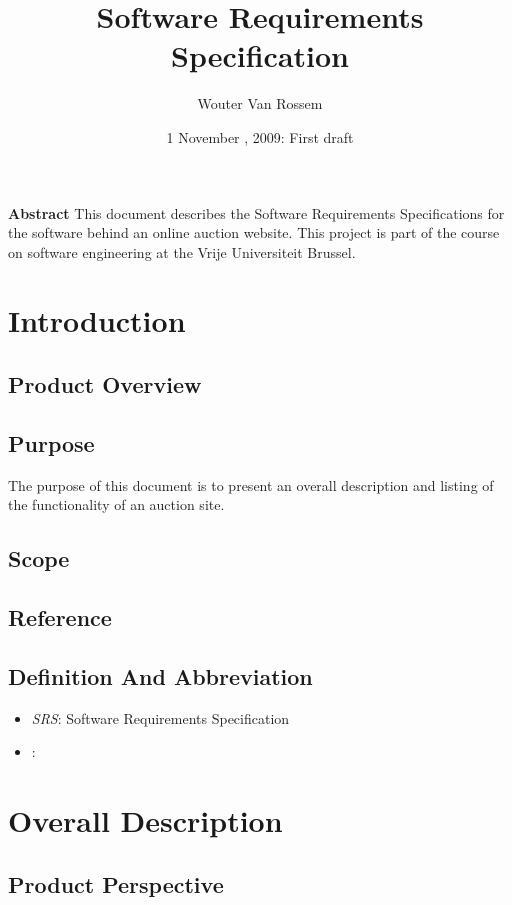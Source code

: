 \documentclass[a4paper, 12pt]{article}
\begin{document}
\title{Software Requirements Specification}
\author{Wouter Van Rossem}
\date{	1 November , 2009: First draft }
\maketitle
\begin{center}
	\textbf{Abstract}
	This document describes the Software Requirements Specifications for
	the software behind an online auction website. This project is part of 
	the course on software engineering at the Vrije Universiteit Brussel.
\end{center}
\newpage
\tableofcontents

\section{Introduction}
	\subsection{Product Overview}
	\subsection{Purpose}
		The purpose of this document is to present an overall description and
		listing of the functionality of an auction site. 
	\subsection{Scope}
	\subsection{Reference}
	\subsection{Definition And Abbreviation}
		\begin{itemize}
			\item \emph{SRS}: Software Requirements Specification
			\item \emph{}:
		\end{itemize}

\section{Overall Description}
	\subsection{Product Perspective}
\end{document}
